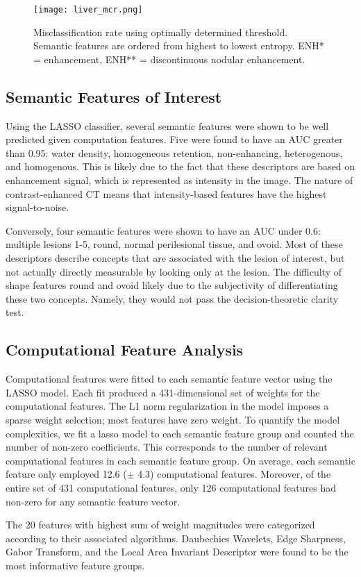 \begin{figure}
	\centering
	\texttt{[image: liver\_mcr.png]}
	\caption[MCR results for liver annotation]{Misclassification rate using optimally determined threshold. Semantic features are ordered from highest to lowest entropy. ENH* = enhancement, ENH** = discontinuous nodular enhancement.}
	\label{fig:liver_mcr}
\end{figure}


\clearpage


\subsection{Semantic Features of Interest}
Using the LASSO classifier, several semantic features were shown to be well predicted given computation features. Five were found to have an AUC greater than 0.95: water density, homogeneous retention, non-enhancing, heterogenous, and homogenous. This is likely due to the fact that these descriptors are based on enhancement signal, which is represented as intensity in the image.
The nature of contrast-enhanced CT means that intensity-based features have the highest signal-to-noise.

Conversely, four semantic features were shown to have an AUC under 0.6: multiple lesions 1-5, round, normal perilesional tissue, and ovoid.
Most of these descriptors describe concepts that are associated with the lesion of interest, but not actually directly measurable by looking only at the lesion.
The difficulty of shape features round and ovoid likely due to the subjectivity of differentiating these two concepts.
Namely, they would not pass the decision-theoretic clarity test.

\subsection{Computational Feature Analysis}
Computational features were fitted to each semantic feature vector using the LASSO model. Each fit produced a 431-dimensional set of weights for the computational features. The L1 norm regularization in the model imposes a sparse weight selection; most features have zero weight. To quantify the model complexities, we fit a lasso model to each semantic feature group and counted the number of non-zero coefficients. This corresponds to the number of relevant computational features in each semantic feature group. On average, each semantic feature only employed 12.6 ($\pm$ 4.3) computational features. Moreover, of the entire set of 431 computational features, only 126 computational features had non-zero for any semantic feature vector.

The 20 features with highest sum of weight magnitudes were categorized according to their associated algorithms. Daubechies Wavelets, Edge Sharpness, Gabor Transform, and the Local Area Invariant Descriptor were found to be the most informative feature groups.
